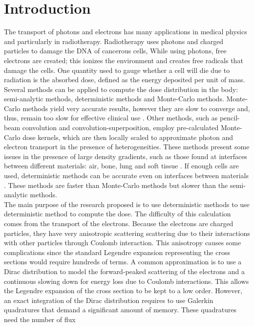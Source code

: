 \section{Introduction}
The transport of photons and electrons has many applications in medical
physics and particularly in radiotherapy. Radiotherapy uses photons and
charged particles to damage the DNA of cancerous cells, While using photons,
free electrons are created; this ionizes the environment and creates free
radicals that damage the cells. One quantity used to gauge whether a cell will
die due to radiation is the absorbed dose, defined as the energy deposited per
unit of mass. Several methods can be applied to compute the dose distribution
in the body: semi-analytic methods, deterministic methods and Monte-Carlo
methods. Monte-Carlo methods yield very accurate results, however they are
slow to converge and, thus, remain too slow for effective clinical use
\cite{acuros}. Other methods, such as pencil-beam convolution and
convolution-superposition, employ pre-calculated Monte-Carlo dose kernels,
which are then locally scaled to approximate photon and electron transport in
the presence of heterogeneities. These methods present some issues in the
presence of large density gradients, such as those found at interfaces between
different materials: air, bone, lung and soft tissue
\cite{acuros,seco,krieger}. If enough cells are used, deterministic methods
can be accurate even on interfaces between materials \cite{acuros}. These
methods are faster than Monte-Carlo methods but slower than the semi-analytic
methods.\\
The main purpose of the research proposed is to use deterministic methods to
use deterministic method to compute the dose. The difficulty of this
calculation comes from the transport of the electrons. Because the electrons
are charged particles, they have very anisotropic scattering scattering due
to their interactions with other particles through Coulomb interaction. This
anisotropy causes some complications since the standard Legendre expansion
representing the cross sections would require hundreds of terms.  A common
approximation is to use a Dirac distribution to model the forward-peaked
scattering of the electrons and a continuous slowing down for energy loss due
to Coulomb interactions. This allows the Legendre expansion of the cross
section to be kept to a low order. However, an exact integration of the Dirac
distribution requires to use Galerkin quadratures \cite{graal} that demand a
significant amount of memory. These quadratures need the number of flux
